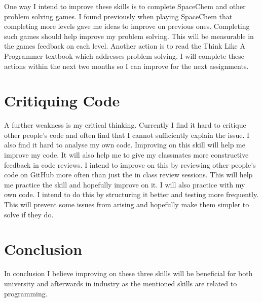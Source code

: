 \documentclass{scrartcl}
\begin{document}
One way I intend to improve these skills is to complete SpaceChem and other problem solving games. I found previously when playing SpaceChem that completing more levels gave me ideas to improve on previous ones. Completing such games should help improve my problem solving.  This will be measurable in the games feedback on each level. Another action is to read the Think Like A Programmer textbook which addresses problem solving.
I will complete these actions within the next two months so I can improve for the next assignments.

\section{Critiquing Code}
A further weakness is my critical thinking. Currently I find it hard to critique other people's code and often find that I cannot sufficiently explain the issue. I also find it hard to analyse my own code. Improving on this skill will help me improve my code. It will also help me to give my classmates more constructive feedback in code reviews.
I intend to improve on this by reviewing other people's code on GitHub more often than just the in class review sessions.  This will help me practice the skill and hopefully improve on it. I will also practice with my own code. I intend to do this by structuring it better and testing more frequently. This will prevent some issues from arising and hopefully make them simpler to solve if they do.
	
\section{Conclusion}
In conclusion I believe improving on these three skills will be beneficial for both university and afterwards in industry as the mentioned skills are related to programming.
\end{document}
